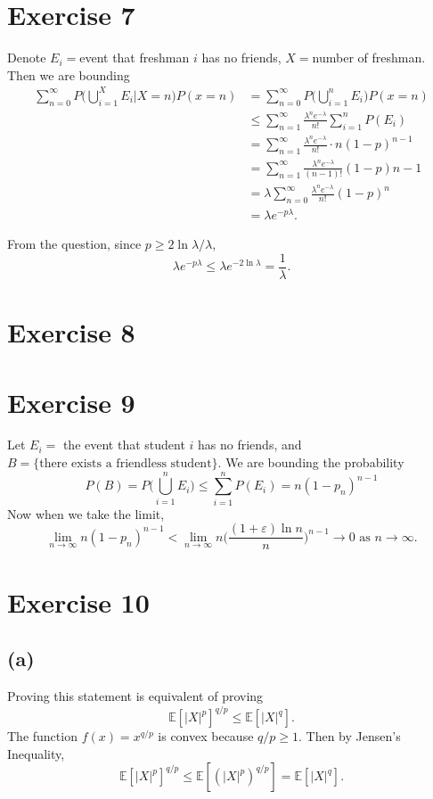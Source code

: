 \section*{Exercise 7}
Denote $E_i = $event that freshman $i$ has no friends, $X = $number of freshman. Then we are bounding
\begin{align*}
	\sum_{n = 0}^{\infty} P \biggl( \bigcup_{i = 1}^X E_i \bigg| X = n \biggr) P(x = n)
	&= \sum_{n = 0}^{\infty} P \biggl( \bigcup_{i = 1}^n E_i \biggr) P(x = n) \\
	&\leq \sum_{n = 1}^{\infty} \frac{\lambda^n e^{-\lambda}}{n!} \sum_{i = 1}^{n} P(E_i) \\
	&= \sum_{n = 1}^{\infty} \frac{\lambda^n e^{-\lambda}}{n!} \cdot n(1 - p)^{n - 1} \\
	&= \sum_{n = 1}^{\infty} \frac{\lambda^n e^{-\lambda}}{(n - 1)!} (1 - p){n - 1} \\
	&= \lambda \sum_{n = 0}^{\infty} \frac{\lambda^n e^{-\lambda}}{n!}(1 - p)^n \\
	&= \lambda e^{-p \lambda}.
\end{align*}

From the question, since $p \geq 2 \ln{\lambda} / \lambda$, 
\[ \lambda e^{-p \lambda} \leq \lambda e^{-2 \ln{\lambda}} = \frac{1}{\lambda}. \]


\newpage
\section*{Exercise 8}
	

\newpage
\section*{Exercise 9}
Let $E_i = $ the event that student $i$ has no friends, and 
$B = \{ \text{there exists a friendless student} \}$. We are bounding the probability 
\[ P(B) 
= P \biggl( \bigcup_{i = 1}^n E_i \biggr) 
\leq \sum_{i = 1}^{n} P(E_i) 
= n(1 - p_n)^{n - 1}
\]
Now when we take the limit, 
\[ \lim_{n \to \infty} n(1 - p_n)^{n - 1} 
< \lim_{n \to \infty} n \biggl( \frac{(1 + \varepsilon) \ln{n}}{n} \biggr)^{n - 1} 
\to 0 \text{  as  } n \to \infty. \]


\newpage
\section*{Exercise 10}
\subsection*{(a)}
Proving this statement is equivalent of proving 
\[ \mathbb{E}[|X|^p]^{q / p} \leq \mathbb{E}[|X|^q]. \]
The function $f(x) = x^{q / p}$ is convex because $q / p \geq 1$. Then by Jensen's Inequality, 
\[ \mathbb{E}[|X|^p]^{q / p} \leq \mathbb{E}[(|X|^p)^{q / p}] = \mathbb{E}[|X|^q]. \]

